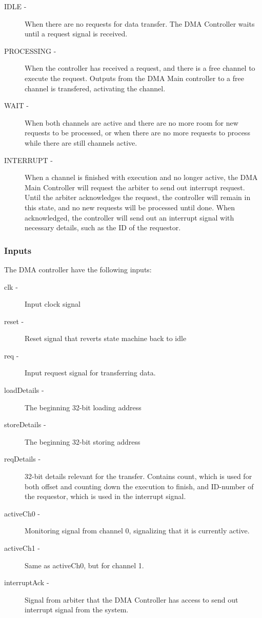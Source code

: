\begin{appendix}
\begin{description}
    \item[IDLE -] 
    When there are no requests for data transfer.
    The DMA Controller waits until a request signal is received.
    \item[PROCESSING -] 
    When the controller has received a request, and there is a free channel to execute the request.
    Outputs from the DMA Main controller to a free channel is transfered, activating the channel.
    \item[WAIT -]
    When both channels are active and there are no more room for new requests to be processed, or when there are no more requests to process while there are still channels active.
    \item [INTERRUPT -]
    When a channel is finished with execution and no longer active, the DMA Main Controller will request the arbiter to send out interrupt request.
    Until the arbiter acknowledges the request, the controller will remain in this state, and no new requests will be processed until done.
    When acknowledged, the controller will send out an interrupt signal with necessary details, such as the ID of the requestor.  
\end{description}

\subsubsection{Inputs}
The DMA controller have the following inputs:

\begin{description}
    \item[clk -]
    Input clock signal
    \item[reset -]
    Reset signal that reverts state machine back to idle
    \item[req -]
    Input request signal for transferring data.
    \item[loadDetails -]
    The beginning 32-bit loading address
    \item[storeDetails -]
    The beginning 32-bit storing address
    \item[reqDetails -]
    32-bit details relevant for the transfer.
    Contains count, which is used for both offset and counting down the execution to finish, and ID-number of the requestor, which is used in the interrupt signal.
    \item[activeCh0 -]
    Monitoring signal from channel 0, signalizing that it is currently active.
    \item[activeCh1 -]
    Same as activeCh0, but for channel 1.
    \item[interruptAck -]
    Signal from arbiter that the DMA Controller has access to send out interrupt signal from the system.
\end{description}


\end{appendix}
